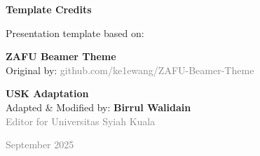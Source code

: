 \documentclass{beamer}
\begin{document}
\begin{frame}{}
  \vfill
  \begin{center}
    {\Large \textcolor{uskGold}{\textbf{Template Credits}}}
    
    \vspace{1.5em}
    
    {\large Presentation template based on:}
    
    \vspace{1em}
    
    {\LARGE \textbf{ZAFU Beamer Theme}}\\
    \vspace{0.5em}
    {\normalsize Original by: \textcolor{gray}{github.com/ke1ewang/ZAFU-Beamer-Theme}}
    
    \vspace{1.5em}
    
    {\large \textcolor{uskGold}{\textbf{USK Adaptation}}}\\
    \vspace{0.5em}
    {\normalsize Adapted \& Modified by: \textbf{Birrul Walidain}}\\
    {\small \textcolor{gray}{Editor for Universitas Syiah Kuala}}
    
    \vspace{1em}
    
    {\small \textcolor{gray}{September 2025}}
  \end{center}
  \vfill
\end{frame}
\end{document}

